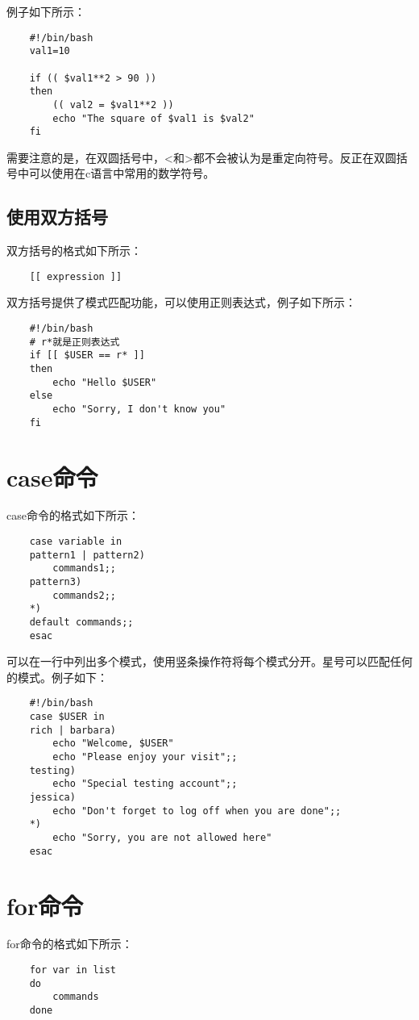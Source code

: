 \documentclass[a4paper,left=1.5cm,right=1.5cm,11pt]{article}
\begin{document}
	例子如下所示：
	\begin{lstlisting}
	#!/bin/bash
	val1=10

	if (( $val1**2 > 90 ))
	then
		(( val2 = $val1**2 ))
		echo "The square of $val1 is $val2"
	fi
	\end{lstlisting}

	需要注意的是，在双圆括号中，<和>都不会被认为是重定向符号。反正在双圆括号中可以使用在c语言中常用的数学符号。

\subsection{使用双方括号}
	双方括号的格式如下所示：
	\begin{lstlisting}
	[[ expression ]]
	\end{lstlisting}

	双方括号提供了模式匹配功能，可以使用正则表达式，例子如下所示：
	\begin{lstlisting}
	#!/bin/bash
	# r*就是正则表达式
	if [[ $USER == r* ]]
	then
		echo "Hello $USER"
	else
		echo "Sorry, I don't know you"
	fi
	\end{lstlisting}

\section{case命令}
	case命令的格式如下所示：
	\begin{lstlisting}
	case variable in
	pattern1 | pattern2) 
		commands1;;
	pattern3) 
		commands2;;
	*) 
	default	commands;;
	esac
	\end{lstlisting}

	可以在一行中列出多个模式，使用竖条操作符将每个模式分开。星号可以匹配任何的模式。例子如下：
	\begin{lstlisting}
	#!/bin/bash
	case $USER in
	rich | barbara)
		echo "Welcome, $USER"
		echo "Please enjoy your visit";;
	testing)
		echo "Special testing account";;
	jessica)
		echo "Don't forget to log off when you are done";;
	*)
		echo "Sorry, you are not allowed here"
	esac
	\end{lstlisting}

\section{for命令}
	for命令的格式如下所示：
	\begin{lstlisting}
	for var in list
	do
		commands
	done
	\end{lstlisting}
\end{document}
